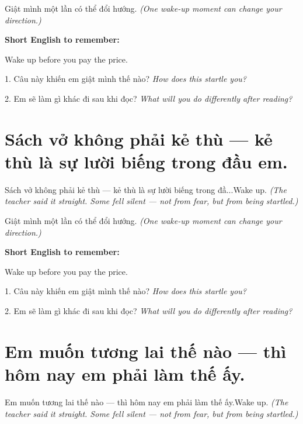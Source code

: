 \begin{baihoc}
Giật mình một lần có thể đổi hướng.
\textit{(One wake-up moment can change your direction.)}
\end{baihoc}

\begin{ghinhoanh}
\textbf{Short English to remember:}

Wake up before you pay the price.

\end{ghinhoanh}

\begin{tuhocnhanh}
1. Câu này khiến em giật mình thế nào? \textit{How does this startle you?}

2. Em sẽ làm gì khác đi sau khi đọc? \textit{What will you do differently after reading?}
\end{tuhocnhanh}
\ngancach


\section{Sách vở không phải kẻ thù — kẻ thù là sự lười biếng trong đầu em.}
\begin{truyen}{Sách vở không phải kẻ thù — kẻ thù là sự lười biếng trong đầ...}{Wake up.}
\textit{(The teacher said it straight. Some fell silent — not from fear, but from being startled.)}
\end{truyen}

\begin{baihoc}
Giật mình một lần có thể đổi hướng.
\textit{(One wake-up moment can change your direction.)}
\end{baihoc}

\begin{ghinhoanh}
\textbf{Short English to remember:}

Wake up before you pay the price.

\end{ghinhoanh}

\begin{tuhocnhanh}
1. Câu này khiến em giật mình thế nào? \textit{How does this startle you?}

2. Em sẽ làm gì khác đi sau khi đọc? \textit{What will you do differently after reading?}
\end{tuhocnhanh}
\ngancach


\section{Em muốn tương lai thế nào — thì hôm nay em phải làm thế ấy.}
\begin{truyen}{Em muốn tương lai thế nào — thì hôm nay em phải làm thế ấy.}{Wake up.}
\textit{(The teacher said it straight. Some fell silent — not from fear, but from being startled.)}
\end{truyen}


